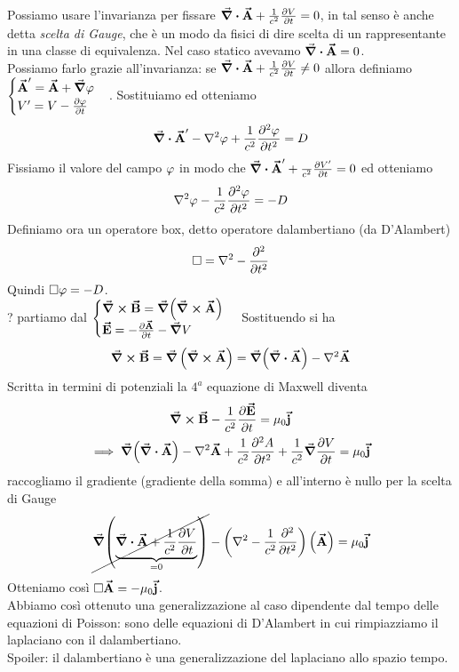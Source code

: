 Possiamo usare l'invarianza per fissare $\div\vb*{\va{A}} +\frac{1}{c^2}\pdv{V}{t}=0$, in tal senso è anche detta \textit{scelta di Gauge}, che è un modo da fisici di dire scelta di un rappresentante in una classe di equivalenza. Nel caso statico avevamo $\div\vb*{\va{A}}=0$.\\
Possiamo farlo grazie all'invarianza: se $\div\vb*{\va{A}} +\frac{1}{c^2} \pdv{V}{t} \neq 0$
allora definiamo $\begin{cases}
	\vba A'=\vba A+\grad\oldphi\\
	V'=V-\pdv{\oldphi}{t}
\end{cases}$. Sostituiamo ed otteniamo
\begin{gather*} 
	\div \vba A'-\laplacian\oldphi +\frac{1}{c^2}\pdv[2]{\oldphi}{t}=D
\end{gather*}
Fissiamo il valore del campo $\oldphi$ in modo che $\div \vb*{\va{A}}'+\frac{}{c^2}\pdv{V'}{t}=0$ ed otteniamo
\begin{gather*}
	\laplacian\oldphi-\frac{1}{c^2}\pdv[2]{\oldphi}{t}=-D
\end{gather*}
Definiamo ora un operatore box, detto operatore dalambertiano (da D'Alambert)
\begin{equation}
	\square=\laplacian -\pdv[2]{t}
\end{equation}
Quindi $\square\oldphi=-D$.\\

?
partiamo dal $\begin{cases}
	\curl\vb*{\va{B}}=\grad(\curl\vb*{\va{A}})\\
	\vb*{\va{E}}=-\pdv{\vb*{\va{A}}}{t}-\grad V
\end{cases}$
Sostituendo si ha
\begin{gather*}
	\curl\vba B= \grad\left( \curl\vba A \right) =\grad(\div\vba A)-\laplacian \vba A
\end{gather*}
Scritta in termini di potenziali la $4^a$ equazione di Maxwell diventa
\begin{gather*}
	\curl\vba B-\frac{1}{c^2}\pdv{\vba E}{t}= \mu_0\vba j \\
	\implies \grad(\div\vba A)-\laplacian\vba A +\frac{1}{c^2} \pdv[2]{A}{t} +\frac{1}{c^2}\grad\pdv{V}{t}=\mu_0\vba j
\end{gather*}
raccogliamo il gradiente (gradiente della somma) e all'interno è nullo per la scelta di Gauge
\begin{gather*}
	\cancel{\grad(\underbrace{\div\vba A +\frac{1}{c^2}\pdv{V}{t}}_{=0})}-\left(\laplacian -\frac{1}{c^2}\pdv[2]{t}\right)\left(\vba A \right)=\mu_0\vba j
\end{gather*}
Otteniamo così $\square\vb*{\va{A}}=-\mu_0\vb*{\va{j}}$.\\
Abbiamo così ottenuto una generalizzazione al caso dipendente dal tempo delle equazioni di Poisson: sono delle equazioni di D'Alambert in cui rimpiazziamo il laplaciano con il dalambertiano.\\
Spoiler: il dalambertiano è una generalizzazione del laplaciano allo spazio tempo.\\



